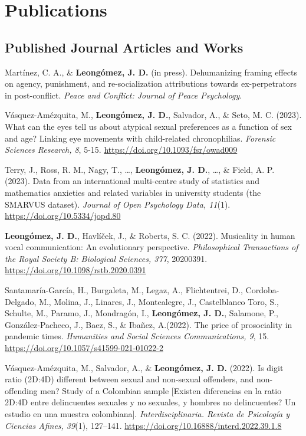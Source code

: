 \documentclass[11pt,a4paper,]{awesome-cv}
\begin{document}
\hypertarget{publications}{%
\section{Publications}\label{publications}}

\hypertarget{section}{%
\subsection{\texorpdfstring{\textbf{Published Journal Articles and Works}}{}}\label{section}}

\begingroup
\footnotesize
\setlength{\parindent}{-0.5in}
\setlength{\leftskip}{0.5in}

Martínez, C. A., \& \textbf{Leongómez, J. D.} (in press). Dehumanizing
framing effects on agency, punishment, and re-socialization attributions
towards ex-perpetrators in post-conflict. \emph{Peace and Conflict:
Journal of Peace Psychology}.

Vásquez-Amézquita, M., \textbf{Leongómez, J. D.}, Salvador, A., \& Seto,
M. C. (2023). What can the eyes tell us about atypical sexual
preferences as a function of sex and age? Linking eye movements with
child-related chronophilias. \emph{Forensic Sciences Research, 8}, 5-15.
\url{https://doi.org/10.1093/fsr/owad009}

Terry, J., Ross, R. M., Nagy, T., \ldots, \textbf{Leongómez, J. D.},
\ldots, \& Field, A. P. (2023). Data from an international multi-centre
study of statistics and mathematics anxieties and related variables in
university students (the SMARVUS dataset). \emph{Journal of Open
Psychology Data, 11}(1). \url{https://doi.org/10.5334/jopd.80}

\textbf{Leongómez, J. D.}, Havlíček, J., \& Roberts, S. C. (2022).
Musicality in human vocal communication: An evolutionary perspective.
\emph{Philosophical Transactions of the Royal Society B: Biological
Sciences, 377}, 20200391. \url{https://doi.org/10.1098/rstb.2020.0391}

Santamaría-García, H., Burgaleta, M., Legaz, A., Flichtentrei, D.,
Cordoba-Delgado, M., Molina, J., Linares, J., Montealegre, J.,
Castelblanco Toro, S., Schulte, M., Paramo, J., Mondragón, I.,
\textbf{Leongómez, J. D.}, Salamone, P., González‑Pacheco, J., Baez, S.,
\& Ibañez, A.(2022). The price of prosociality in pandemic times.
\emph{Humanities and Social Sciences Communications, 9}, 15.
\url{https://doi.org/10.1057/s41599-021-01022-2}

Vásquez-Amézquita, M., Salvador, A., \& \textbf{Leongómez, J. D.}
(2022). Is digit ratio (2D:4D) different between sexual and non-sexual
offenders, and non-offending men? Study of a Colombian sample {[}Existen
diferencias en la ratio 2D:4D entre delincuentes sexuales y no sexuales,
y hombres no delincuentes? Un estudio en una muestra colombiana{]}.
\emph{Interdisciplinaria. Revista de Psicología y Ciencias Afines,
39}(1), 127--141. \url{https://doi.org/10.16888/interd.2022.39.1.8}
\end{document}
